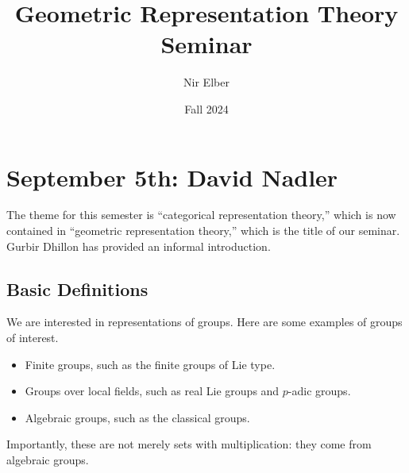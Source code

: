 \documentclass{article}
\title{Geometric Representation Theory Seminar}
\author{Nir Elber}
\date{Fall 2024}
\begin{document}
\maketitle

\tableofcontents

\section{September 5th: David Nadler}
The theme for this semester is ``categorical representation theory,'' which is now contained in ``geometric representation theory,'' which is the title of our seminar. Gurbir Dhillon \cite{dhillon-cat-rep-theory} has provided an informal introduction.

\subsection{Basic Definitions}
We are interested in representations of groups. Here are some examples of groups of interest.
\begin{itemize}
	\item Finite groups, such as the finite groups of Lie type.
	\item Groups over local fields, such as real Lie groups and $p$-adic groups.
	\item Algebraic groups, such as the classical groups.
\end{itemize}
Importantly, these are not merely sets with multiplication: they come from algebraic groups.
\end{document}
